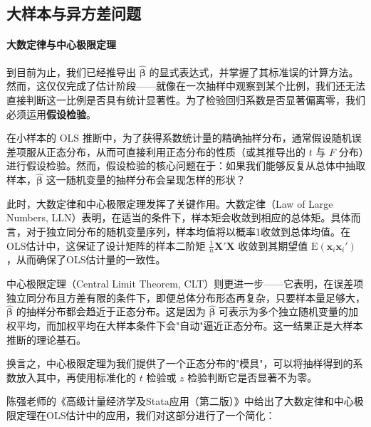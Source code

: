 \subsection{大样本与异方差问题}

\paragraph*{大数定律与中心极限定理}

到目前为止，我们已经推导出 $\hat{\boldsymbol{\beta}}$ 的显式表达式，并掌握了其标准误的计算方法。然而，这仅仅完成了估计阶段——就像在一次抽样中观察到某个比例，我们还无法直接判断这一比例是否具有统计显著性。为了检验回归系数是否显著偏离零，我们必须运用\textbf{假设检验}。

在小样本的 OLS 推断中，为了获得系数统计量的精确抽样分布，通常假设随机误差项服从正态分布，从而可直接利用正态分布的性质（或其推导出的 $t$ 与 $F$ 分布）进行假设检验。然而，假设检验的核心问题在于：如果我们能够反复从总体中抽取样本，$\hat{\boldsymbol{\beta}}$ 这一随机变量的抽样分布会呈现怎样的形状？

此时，大数定律和中心极限定理发挥了关键作用。大数定律（Law of Large Numbers, LLN）表明，在适当的条件下，样本矩会收敛到相应的总体矩。具体而言，对于独立同分布的随机变量序列，样本均值将以概率1收敛到总体均值。在OLS估计中，这保证了设计矩阵的样本二阶矩 $\frac{1}{n}\mathbf{X}'\mathbf{X}$ 收敛到其期望值 $\mathrm{E}(\mathbf{x}_i\mathbf{x}_i')$，从而确保了OLS估计量的一致性。

中心极限定理（Central Limit Theorem, CLT）则更进一步——它表明，在误差项独立同分布且方差有限的条件下，即便总体分布形态再复杂，只要样本量足够大，$\hat{\boldsymbol{\beta}}$ 的抽样分布都会趋近于正态分布。这是因为 $\hat{\boldsymbol{\beta}}$ 可表示为多个独立随机变量的加权平均，而加权平均在大样本条件下会"自动"逼近正态分布。这一结果正是大样本推断的理论基石。

换言之，中心极限定理为我们提供了一个正态分布的"模具"，可以将抽样得到的系数放入其中，再使用标准化的 $t$ 检验或 $z$ 检验判断它是否显著不为零。

陈强老师的《高级计量经济学及Stata应用（第二版）》中给出了大数定律和中心极限定理在OLS估计中的应用，我们对这部分进行了一个简化：

